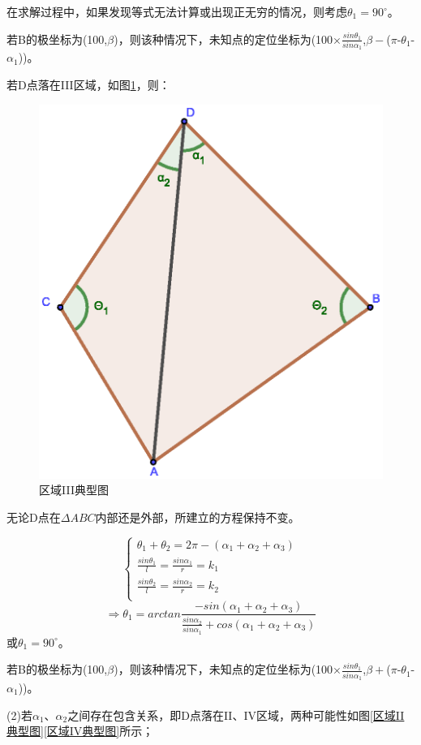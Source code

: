 \documentclass{ctexart}
\begin{document}
在求解过程中，如果发现等式无法计算或出现正无穷的情况，则考虑$\theta_1=90^{\circ}$。

若B的极坐标为(100,$\beta$)，则该种情况下，未知点的定位坐标为(100$\times\frac{sin\theta_1}{sin\alpha_1}$,$\beta -$($\pi$-$\theta_1$-$\alpha_1$))。



若D点落在III区域，如图\ref{区域III典型图}，则：

\begin{figure}[H]
  \centering
  \includegraphics[width=0.40\linewidth]{pic/case3+.eps}
  \caption{区域III典型图}
  \label{区域III典型图}
  \end{figure} 


无论D点在$\Delta ABC$内部还是外部，所建立的方程保持不变。

\begin{equation}
    \left\{
              \begin{array}{ll}
                \theta_1+\theta_2=2\pi-(\alpha_1+\alpha_2+\alpha_3)\\
                \frac{sin\theta_1}{l}=\frac{sin\alpha_1}{r}=k_1\\
                \frac{sin\theta_2}{l}=\frac{sin\alpha_2}{r}=k_2\\

              \end{array}
            \right.
\end{equation}
\[
    \Rightarrow \theta_1=arctan \frac{-sin(\alpha_1+\alpha_2+\alpha_3)}{\frac{sin\alpha_2}{sin\alpha_1}+cos(\alpha_1+\alpha_2+\alpha_3)}
\]
或$\theta_1=90^{\circ}$。

若B的极坐标为(100,$\beta$)，则该种情况下，未知点的定位坐标为(100$\times\frac{sin\theta_1}{sin\alpha_1}$,$\beta +$($\pi$-$\theta_1$-$\alpha_1$))。


(2)若$\alpha_1$、$\alpha_2$之间存在包含关系，即D点落在II、IV区域，两种可能性如图\ref{区域II典型图}\ref{区域IV典型图}所示；
\end{document}
